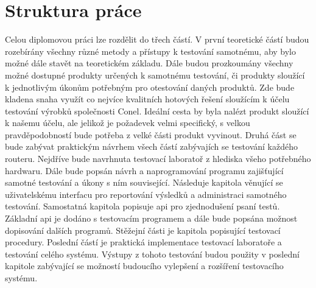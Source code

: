\section{Struktura práce}
Celou diplomovou práci lze rozdělit do třech částí. V první teoretické částí budou rozebírány všechny různé metody a přístupy k testování samotnému, aby bylo možné dále stavět na teoretickém základu. Dále budou prozkoumány všechny možné dostupné produkty určených k samotnému testování, či produkty sloužící k jednotlivým úkonům potřebným pro otestování daných produktů. Zde bude kladena snaha využít co nejvíce kvalitních hotových řešení sloužícím k účelu testování výrobků společnosti Conel. Ideální cesta by byla nalézt produkt sloužící k našemu účelu, ale jelikož je požadevek velmi specifický, s velkou pravděpodobností bude potřeba z velké části produkt vyvinout. Druhá část se bude zabývat praktickým návrhem všech částí zabývajích se testování každého routeru. Nejdříve bude navrhnuta testovací laboratoř z hlediska všeho potřebného hardwaru. Dále bude popsán návrh a naprogramování programu zajišťující samotné testování a úkony s ním související. Následuje kapitola věnující se uživatelskému interfacu pro reportování výsledků a administraci samotného testování. Samostatná kapitola popisuje api pro zjednodušení psaní testů. Základní api je dodáno s testovacím programem a dále bude popsána možnost dopisování dalších programů. Stěžejní části je kapitola popisující testovací procedury. Poslední částí je praktická implementace testovací laboratoře a testování celého systému. Výstupy z tohoto testování budou použity v poslední kapitole zabývající se možností budoucího vylepšení a rozšíření testovacího systému.

\endinput

